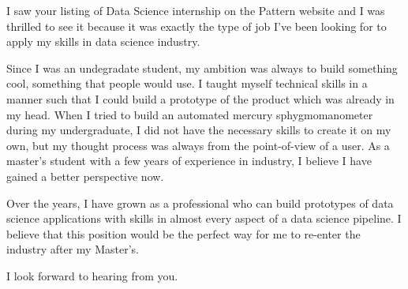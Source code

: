 I saw your listing of Data Science internship on the Pattern website and I was thrilled to see it because it was exactly the type of job I've been looking for to apply my skills in data science industry.

Since I was an undegradate student, my ambition was always to build something cool, something that people would use. I taught myself technical skills in a manner such that I could build a prototype of the product which was already in my head. When I tried to build an automated mercury sphygmomanometer during my undergraduate, I did not have the necessary skills to create it on my own, but my thought process was always from the point-of-view of a user. As a master's student with a few years of experience in industry, I believe I have gained a better perspective now.

Over the years, I have grown as a professional who can build prototypes of data science applications with skills in almost every aspect of a data science pipeline. I believe that this position would be the perfect way for me to re-enter the industry after my Master's. 

I look forward to hearing from you.